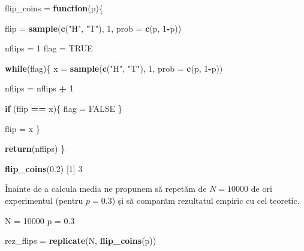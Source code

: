 \documentclass[]{article}
\newenvironment{Shaded}{\begin{snugshade}}{\end{snugshade}}
\newcommand{\KeywordTok}[1]{\textcolor[rgb]{0.13,0.29,0.53}{\textbf{#1}}}
\newcommand{\DataTypeTok}[1]{\textcolor[rgb]{0.13,0.29,0.53}{#1}}
\newcommand{\DecValTok}[1]{\textcolor[rgb]{0.00,0.00,0.81}{#1}}
\newcommand{\FloatTok}[1]{\textcolor[rgb]{0.00,0.00,0.81}{#1}}
\newcommand{\StringTok}[1]{\textcolor[rgb]{0.31,0.60,0.02}{#1}}
\newcommand{\OtherTok}[1]{\textcolor[rgb]{0.56,0.35,0.01}{#1}}
\newcommand{\ControlFlowTok}[1]{\textcolor[rgb]{0.13,0.29,0.53}{\textbf{#1}}}
\newcommand{\OperatorTok}[1]{\textcolor[rgb]{0.81,0.36,0.00}{\textbf{#1}}}
\newcommand{\NormalTok}[1]{#1}
\begin{document}
\begin{Shaded}
\begin{Highlighting}[]
\NormalTok{flip_coins =}\StringTok{ }\ControlFlowTok{function}\NormalTok{(p)\{}
  
\NormalTok{  flip =}\StringTok{ }\KeywordTok{sample}\NormalTok{(}\KeywordTok{c}\NormalTok{(}\StringTok{"H"}\NormalTok{, }\StringTok{"T"}\NormalTok{), }\DecValTok{1}\NormalTok{, }\DataTypeTok{prob =} \KeywordTok{c}\NormalTok{(p, }\DecValTok{1}\OperatorTok{-}\NormalTok{p))}
  
\NormalTok{  nflips =}\StringTok{ }\DecValTok{1}
\NormalTok{  flag =}\StringTok{ }\OtherTok{TRUE}
  
  \ControlFlowTok{while}\NormalTok{(flag)\{}
\NormalTok{    x =}\StringTok{ }\KeywordTok{sample}\NormalTok{(}\KeywordTok{c}\NormalTok{(}\StringTok{"H"}\NormalTok{, }\StringTok{"T"}\NormalTok{), }\DecValTok{1}\NormalTok{, }\DataTypeTok{prob =} \KeywordTok{c}\NormalTok{(p, }\DecValTok{1}\OperatorTok{-}\NormalTok{p))}
    
\NormalTok{    nflips =}\StringTok{ }\NormalTok{nflips }\OperatorTok{+}\StringTok{ }\DecValTok{1}
    
    \ControlFlowTok{if}\NormalTok{ (flip }\OperatorTok{==}\StringTok{ }\NormalTok{x)\{}
\NormalTok{      flag =}\StringTok{ }\OtherTok{FALSE}
\NormalTok{    \}}
    
\NormalTok{    flip =}\StringTok{ }\NormalTok{x}
\NormalTok{  \}}
  
  \KeywordTok{return}\NormalTok{(nflips)}
\NormalTok{\}}

\KeywordTok{flip_coins}\NormalTok{(}\FloatTok{0.2}\NormalTok{)}
\NormalTok{[}\DecValTok{1}\NormalTok{] }\DecValTok{3}
\end{Highlighting}
\end{Shaded}

Înainte de a calcula media ne propunem să repetăm de \(N = 10000\) de
ori experimentul (pentru \(p=0.3\)) și să comparăm rezultatul empiric cu
cel teoretic.

\begin{Shaded}
\begin{Highlighting}[]
\NormalTok{N =}\StringTok{ }\DecValTok{10000}
\NormalTok{p =}\StringTok{ }\FloatTok{0.3}

\NormalTok{rez_flips =}\StringTok{ }\KeywordTok{replicate}\NormalTok{(N, }\KeywordTok{flip_coins}\NormalTok{(p))}
\end{Highlighting}
\end{Shaded}
\end{document}
